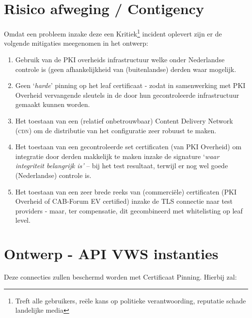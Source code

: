 \documentclass[11.0pt,twoside,openright]{report}
\begin{document}
\section{Risico afweging / Contigency}

Omdat een probleem inzake deze een  Kritiek\footnote{Treft alle gebruikers, reële kans op politieke verantwoording, reputatie schade landelijke media} incident oplevert zijn er de volgende mitigaties meegenomen in het ontwerp:

\begin{enumerate}
\item Gebruik van de PKI overheids infrastructuur welke onder Nederlandse controle is (geen afhankelijkheid van (buitenlandse) derden waar mogelijk.
\item Geen `\emph{harde}' pinning op het leaf certificaat - zodat in samenwerking met PKI Overheid vervangende sleutels in de door hun gecontroleerde infrastructuur gemaakt kunnen worden.
\item Het toestaan van een (relatief onbetrouwbaar) Content Delivery Network (\textsc{cdn}) om de distributie van het configuratie zeer robuust te maken.
\item Het toestaan van een gecontroleerde set certificaten (van PKI Overheid) om integratie door derden makkelijk te maken inzake de signature `\emph{waar integriteit belangrijk is'} -- bij het test resultaat, terwijl er nog wel goede (Nederlandse) controle is.
\item Het toestaan van een zeer brede reeks van (commerciële) certificaten (PKI Overheid of CAB-Forum EV certified) inzake de TLS connectie naar test providers - maar, ter compensatie, dit gecombineerd met whitelisting op leaf level.
\end{enumerate}


\section{Ontwerp - API VWS instanties}
\label{api}

Deze connecties zullen beschermd worden met Certificaat Pinning. Hierbij zal:
\end{document}
